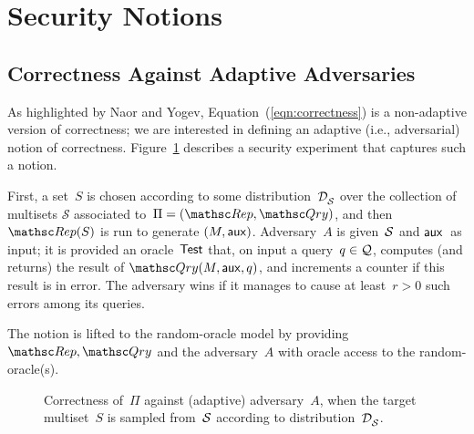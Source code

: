 \section{Security Notions}
\label{sec:security-notions}

\subsection{Correctness Against Adaptive Adversaries}
As highlighted by Naor and Yogev, Equation~(\ref{eqn:correctness}) is a non-adaptive version of correctness;
we are interested in defining an adaptive (i.e., adversarial) notion
of correctness.   Figure~\ref{fig:correctness} describes a security
experiment that captures such a notion.

First, a set~$S$ is chosen according to some
distribution~$\mathcal{D}_{{\cal S}}^{}$ over the collection of multisets
$\mathcal{S}$ associated to~$\Pi=(\Rep,\Qry)$, and then
$\Rep(S)$ is run to generate $(M,{\sf aux})$.
Adversary~$A$ is given~${\cal S}$ and ${\sf aux}$~as input; it is
provided an oracle~$\mathsf{Test}$ that, on input a query~$q \in {\cal Q}$,
computes (and returns) the result of $\Qry(M,\aux,q)$, and increments
a counter if this result is in error.  The adversary wins if it
manages to cause at least~$r>0$ such errors among its queries.

The notion is lifted to the random-oracle model by providing
$\Rep,\Qry$ and the adversary~$A$ with oracle access to the
random-oracle(s).



\begin{figure}[htp]
\centering
{}
\caption{Correctness of~$\Pi$ against (adaptive) adversary~$A$, when
  the target multiset~$S$ is sampled from~${\cal S}$ according to distribution~$\mathcal{D}_{{\cal S}}^{}$.} 
\label{fig:correctness}
\end{figure}


